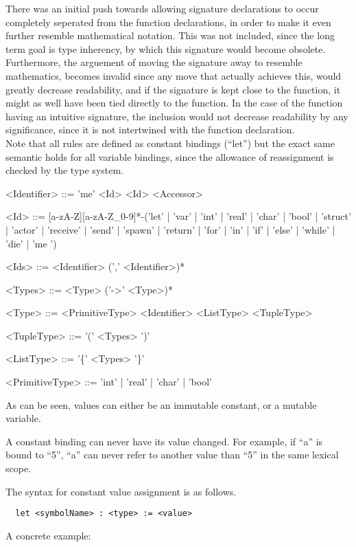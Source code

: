 There was an initial push towards allowing signature declarations to occur completely seperated from the function declarations, in order to make it even further resemble mathematical notation. This was not included, since the long term goal is type inherency, by which this signature would become obsolete. Furthermore, the arguement of moving the signature away to resemble mathematics, becomes invalid since any move that actually achieves this, would greatly decrease readability, and if the signature is kept close to the function, it might as well have been tied directly to the function. In the case of the function having an intuitive signature, the inclusion would not decrease readability by any significance, since it is not intertwined with the function declaration.\\

Note that all rules are defined as constant bindings (\enquote{let}) but the exact same semantic holds for all variable bindings, since the allowance of reassignment is checked by the type system.

\begin{grammar}
<Identifier> ::= 'me'
 \alt <Id>
 \alt <Id> <Accessor>

<Id> ::= [a-zA-Z][a-zA-Z\_0-9]*-('let' | 'var' | 'int' | 'real' | 'char' | 'bool' | 'struct' | 'actor' | 'receive' | 'send' | 'spawn' | 'return' | 'for' | 'in' | 'if' | 'else' | 'while' | 'die' | 'me ')

<Ids> ::= <Identifier> (',' <Identifier>)*

<Types> ::= <Type> ('->' <Type>)*

<Type> ::= <PrimitiveType>
 \alt <Identifier>
 \alt <ListType>
 \alt <TupleType>

<TupleType> ::= '(' <Types> ')'

<ListType> ::= '\{' <Types> '\}'

<PrimitiveType> ::= 'int' | 'real' | 'char' | 'bool'
\end{grammar}

As can be seen, values can either be an immutable constant, or a mutable variable.

A constant binding can never have its value changed. For example, if \enquote{a} is bound to \enquote{5}, \enquote{a} can never refer to another value than \enquote{5} in the same lexical scope. 

The syntax for constant value assignment is as follows.
\begin{verbatim}
  let <symbolName> : <type> := <value>
\end{verbatim}
A concrete example:

